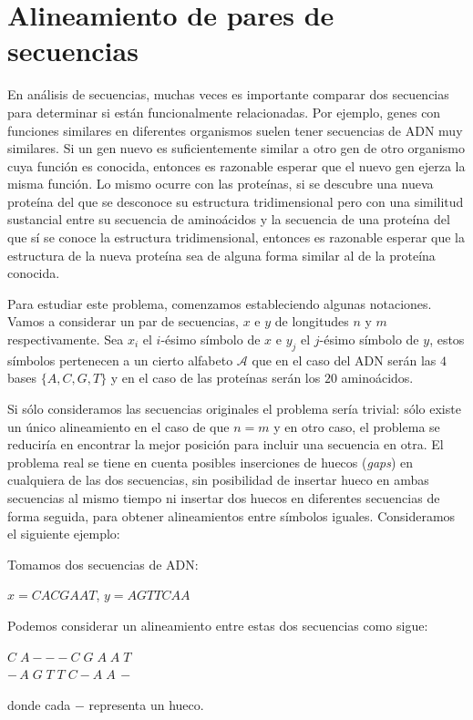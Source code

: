\section{Alineamiento de pares de secuencias}
En análisis de secuencias, muchas veces es importante comparar dos secuencias para determinar si están funcionalmente relacionadas. Por ejemplo, genes con funciones similares en diferentes organismos suelen tener secuencias de ADN muy similares. Si un gen nuevo es suficientemente similar a otro gen de otro organismo cuya función es conocida, entonces es razonable esperar que el nuevo gen ejerza la misma función. Lo mismo ocurre con las proteínas, si se descubre una nueva proteína del que se desconoce su estructura tridimensional pero con una similitud sustancial entre su secuencia de aminoácidos y la secuencia de una proteína del que sí se conoce la estructura tridimensional, entonces es razonable esperar que la estructura de la nueva proteína sea de alguna forma similar al de la proteína conocida.

Para estudiar este problema, comenzamos estableciendo algunas notaciones. Vamos a considerar un par de secuencias, $x$ e $y$ de longitudes $n$ y $m$ respectivamente. Sea $x_i$ el $i$-ésimo símbolo de $x$ e $y_j$ el $j$-ésimo símbolo de $y$, estos símbolos pertenecen a un cierto alfabeto $\mathcal{A}$ que en el caso del ADN serán las $4$ bases $\{A,C,G,T\}$ y en el caso de las proteínas serán los $20$ aminoácidos.

Si sólo consideramos las secuencias originales el problema sería trivial: sólo existe un único alineamiento en el caso de que $n=m$ y en otro caso, el problema se reduciría en encontrar la mejor posición para incluir una secuencia en otra. El problema real se tiene en cuenta posibles inserciones de huecos (\textit{gaps}) en cualquiera de las dos secuencias, sin posibilidad de insertar hueco en ambas secuencias al mismo tiempo ni insertar dos huecos en diferentes secuencias de forma seguida, para obtener alineamientos entre símbolos iguales. Consideramos el siguiente ejemplo:

\begin{exampleth}
    Tomamos dos secuencias de ADN:
    \begin{center}
        $x=CACGAAT$, $y=AGTTCAA$
    \end{center}
    Podemos considerar un alineamiento entre estas dos secuencias como sigue:
    \begin{center}
        $C\; A - - - C\; G\; A\; A\; T$ \\
        $-\, A\; G\; T\; T\; C - A\; A\, -$
    \end{center}
    donde cada $-$ representa un hueco.
\end{exampleth}

